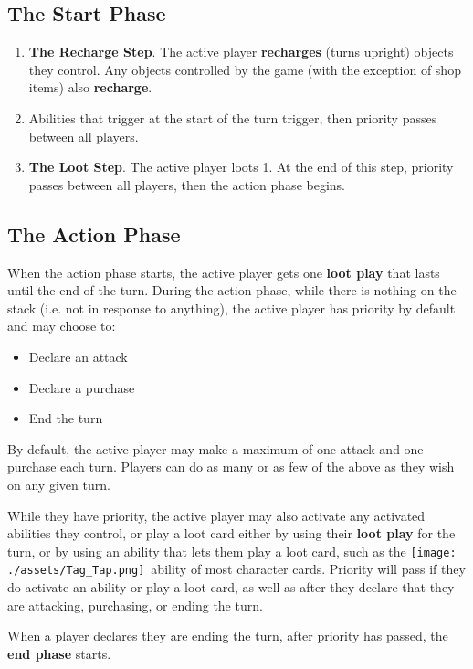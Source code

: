 \documentclass[10pt, a4paper, twoside]{article} %
\newcommand{\tap}{\texttt{[image: ./assets/Tag\_Tap.png]}}
\begin{document}
    \subsection{The Start Phase}
    \begin{enumerate}
        \item \textbf{The Recharge Step}. The active player \textbf{recharges} (turns upright) objects they control. Any objects controlled by the game (with the exception of shop items) also \textbf{recharge}.
        \item Abilities that trigger at the start of the turn trigger, then priority passes between all players.
        \item \textbf{The Loot Step}. The active player loots 1. At the end of this step, priority passes between all players, then the action phase begins.
    \end{enumerate}

    \subsection{The Action Phase}
    When the action phase starts, the active player gets one \textbf{loot play} that lasts until the end of the turn. During the action phase, while there is nothing on the stack (i.e. not in response to anything), the active player has priority by default and may choose to:
    \begin{itemize}
        \item Declare an attack
        \item Declare a purchase
        \item End the turn
    \end{itemize}
    By default, the active player may make a maximum of one attack and one purchase each turn.  Players can do as many or as few of the above as they wish on any given turn.

    While they have priority, the active player may also activate any activated abilities they control, or play a loot card either by using their \textbf{loot play} for the turn, or by using an ability that lets them play a loot card, such as the \tap\ ability of most character cards. Priority will pass if they do activate an ability or play a loot card, as well as after they declare that they are attacking, purchasing, or ending the turn.

    When a player declares they are ending the turn, after priority has passed, the \textbf{end phase} starts.
\end{document}
